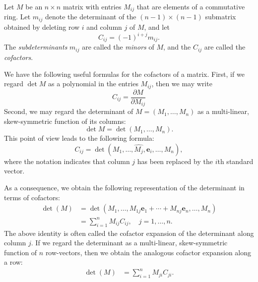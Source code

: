 \documentclass{article}
\newcommand{\be}{\mathbf{e}}
\begin{document}
Let $M$ be an $n\times n$ matrix with entries $M_{ij}$ that are
elements of a commutative ring.
Let $m_{ij}$ denote the
determinant of the $(n-1)\times(n-1)$ submatrix obtained by deleting
row $i$ and column  
$j$ of $M$, and let
$$C_{ij} = (-1)^{i+j} m_{ij}.$$
The \emph{subdeterminants} $m_{ij}$ are called  the \emph{minors} of $M$, and the 
$C_{ij}$ are called the \emph{cofactors}.   

We have the following useful formulas for the cofactors of a matrix.
First, if we regard $\det M$ as a polynomial in the entries $M_{ij}$, then we may write
\begin{equation}
  C_{ij} = \frac{\partial M}{\partial M_{ij}}
\end{equation}
Second, we may regard the determinant of $M=(M_1,\ldots,  M_n)$ as a multi-linear, skew-symmetric function of its columns:
\[  \det M = \det(M_1,\ldots, M_n).\]
This point of view leads to the following formula:
\begin{equation}
C_{ij} = \det(M_1,\ldots, \hat{M_j}, \be_i,\ldots, M_n),
\end{equation}
where the notation indicates that column $j$ has been replaced by the $i$th standard vector.

As a consequence, we obtain the following representation of the determinant in terms of
cofactors:
\begin{align*}
   \det(M) &= \det(M_1,\ldots, M_{1j} \be_1 + \cdots + M_{nj} \be_n , \ldots , M_n)\\
  &= \sum_{i=1}^n  M_{ij} C_{ij},\quad j=1,\ldots, n.
\end{align*}
The above identity is often called the cofactor expansion of the determinant along column $j$.  
If we regard the determinant as a multi-linear, skew-symmetric function of $n$ row-vectors, then we obtain the
analogous cofactor expansion along a row:
\begin{align*}
\det(M) &= \sum_{i=1}^n M_{ji} C_{ji}.
\end{align*}
\end{document}
